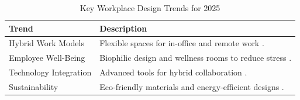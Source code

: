 \documentclass[12pt]{article}
\begin{document}
\begin{table}[h]
    \centering
    \caption{Key Workplace Design Trends for 2025}
    \begin{tabular}{p{5cm}p{10cm}}
        \toprule
        \textbf{Trend} & \textbf{Description} \\
        \midrule
        Hybrid Work Models & Flexible spaces for in-office and remote work \citep{gensler2025}. \\
        Employee Well-Being & Biophilic design and wellness rooms to reduce stress \citep{haiken2023}. \\
        Technology Integration & Advanced tools for hybrid collaboration \citep{gensler2024}. \\
        Sustainability & Eco-friendly materials and energy-efficient designs \citep{edge2025}. \\
        \bottomrule
    \end{tabular}
\end{table}


\end{document}
